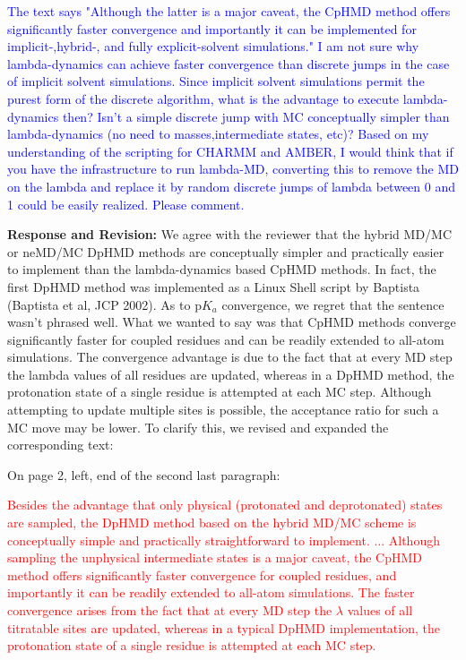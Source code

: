 \documentclass[11pt,letterpaper]{businessletter}
\newcommand{\pka}{p$K_a$}
\begin{document}
\begin{letter}
\textcolor{Blue}{
The text says "Although the latter is a major caveat, the CpHMD method offers significantly faster convergence and importantly it can be implemented for implicit-,hybrid-, and fully explicit-solvent simulations." I am not sure why lambda-dynamics can achieve faster convergence than discrete jumps in the case of implicit solvent simulations. Since implicit solvent simulations permit the purest form of the discrete algorithm, what is the advantage to execute lambda-dynamics then? Isn’t a simple discrete jump with MC conceptually simpler than lambda-dynamics (no need to masses,intermediate states, etc)? Based on my understanding of the scripting for CHARMM and AMBER, I would think that if you have the infrastructure to run lambda-MD, converting this to remove the MD on the lambda and replace it by random discrete jumps of lambda between 0 and 1 could be easily realized. Please comment.
}


\textbf{Response and Revision:} 
We agree with the reviewer that the hybrid MD/MC or neMD/MC DpHMD methods are conceptually simpler
and practically easier to implement than the lambda-dynamics based CpHMD methods. 
In fact, the first DpHMD method was implemented as a Linux Shell
script by Baptista (Baptista et al, JCP 2002). 
As to {\pka} convergence, we regret that the sentence wasn't phrased well.
What we wanted to say was that CpHMD methods converge significantly faster 
for coupled residues and can be readily extended to all-atom simulations.
The convergence advantage is due to the fact that at every MD step the lambda values of all residues are updated,
whereas in a DpHMD method, the protonation state of a single residue is attempted at each MC step.
Although attempting to update multiple sites is possible, 
the acceptance ratio for such a MC move may be lower.
To clarify this, we revised and expanded the corresponding text:

On page 2, left, end of the second last paragraph:

\textcolor{red}{
Besides the advantage that only physical (protonated and deprotonated) states are sampled, the DpHMD method based on
the hybrid MD/MC scheme is conceptually simple
and practically straightforward to implement.
...
Although sampling the unphysical intermediate states is a major caveat, the CpHMD method offers significantly faster convergence for coupled residues,
and importantly it can be readily extended to all-atom simulations.
The faster convergence arises from the fact that at every MD step the $\lambda$ values of 
all titratable sites are updated, whereas in a typical DpHMD implementation, the protonation state of 
a single residue is attempted at each MC step.
}


\end{letter}
\end{document}
